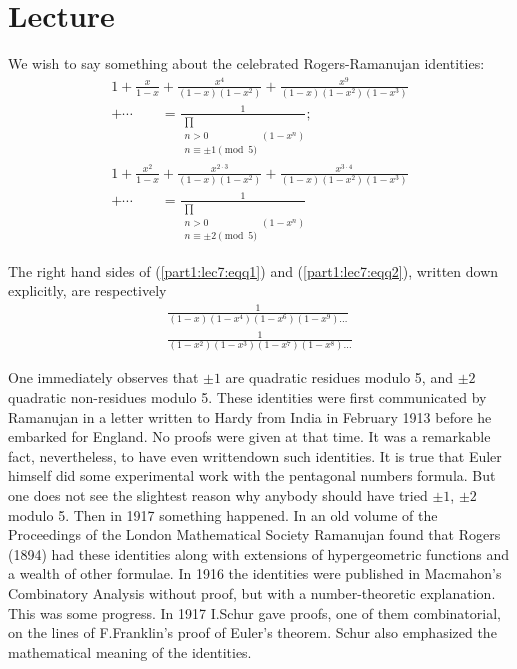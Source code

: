 \chapter{Lecture}\label{part1:lec7}

We \pageoriginale wish to say something about the celebrated
Rogers-Ramanujan identities:
\begin{align*}
  1 + \frac{x}{1-x} + \frac{x^4}{(1-x)(1-x^2)} +
  \frac{x^9}{(1-x)(1-x^2)(1-x^3)} \\
  +\cdots \qquad =
  \frac{1}{\substack{\prod\\n>0\\n \equiv \pm 1
      \pmod{5}}(1-x^n)};\tag{1}\label{part1:lec7:eqq1} \\
  1+ \frac{x^2}{1-x}+ \frac{x^{2\cdot 3}}{(1-x)(1-x^2)} +
  \frac{x^{3\cdot 4}}{(1-x)(1-x^2)(1-x^3)}\\
  + \cdots \qquad  = 
 \frac{1}{\substack{\prod\\n>0\\n \equiv \pm 2 \pmod{5}}(1-x^n)}
 \tag{2}\label{part1:lec7:eqq2} 
\end{align*}

The right hand sides of (\ref{part1:lec7:eqq1}) and
(\ref{part1:lec7:eqq2}), written  down explicitly, are respectively
\begin{gather*}
  \frac{1}{(1-x)(1-x^4)(1-x^6)(1-x^9)\ldots}\\
  \frac{1}{(1-x^2)(1-x^3)(1-x^7)(1-x^8)\ldots}
\end{gather*}

One immediately observes that $\pm 1$ are quadratic residues modulo 5,
and $\pm 2$ quadratic non-residues modulo 5. These identities were
first communicated by Ramanujan in a letter written to Hardy from
India in February 1913 before he embarked for England. No proofs were
given at that time. It was a remarkable fact, nevertheless, to have
even written\pageoriginale down such identities. It is true that
Euler himself did some experimental work with the pentagonal numbers
formula. But one does not see the slightest reason why anybody should
have tried $\pm 1$, $\pm 2$ modulo 5. Then in 1917 something
happened. In an old volume of the Proceedings of the London
Mathematical Society Ramanujan found that Rogers (1894) had these
identities along with extensions of hypergeometric functions and a
wealth of other formulae. In 1916 the identities were published in
Macmahon's Combinatory Analysis without proof, but with a
number-theoretic explanation. This was some progress. In 1917 I.Schur
gave proofs, one of them combinatorial, on the lines of F.Franklin's
proof of Euler's theorem. Schur also emphasized the mathematical
meaning of the identities. 

